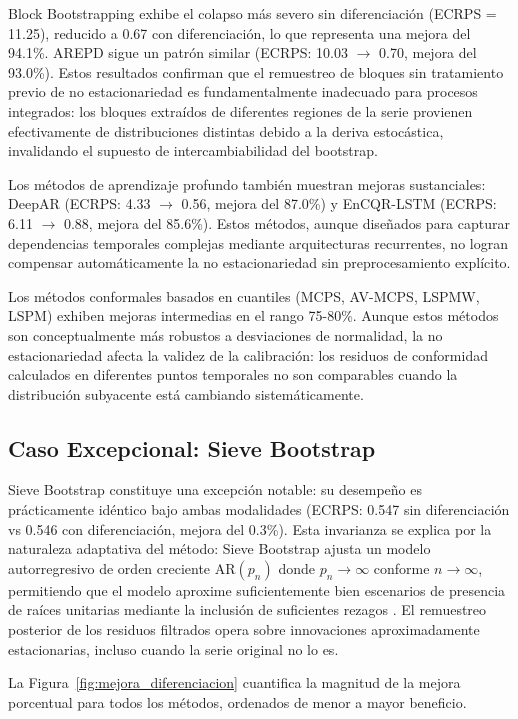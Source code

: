 Block Bootstrapping exhibe el colapso más severo sin diferenciación (ECRPS = 11.25), reducido a 0.67 con diferenciación, lo que representa una mejora del 94.1\%. AREPD sigue un patrón similar (ECRPS: 10.03 $\to$ 0.70, mejora del 93.0\%). Estos resultados confirman que el remuestreo de bloques sin tratamiento previo de no estacionariedad es fundamentalmente inadecuado para procesos integrados: los bloques extraídos de diferentes regiones de la serie provienen efectivamente de distribuciones distintas debido a la deriva estocástica, invalidando el supuesto de intercambiabilidad del bootstrap.

Los métodos de aprendizaje profundo también muestran mejoras sustanciales: DeepAR (ECRPS: 4.33 $\to$ 0.56, mejora del 87.0\%) y EnCQR-LSTM (ECRPS: 6.11 $\to$ 0.88, mejora del 85.6\%). Estos métodos, aunque diseñados para capturar dependencias temporales complejas mediante arquitecturas recurrentes, no logran compensar automáticamente la no estacionariedad sin preprocesamiento explícito.

Los métodos conformales basados en cuantiles (MCPS, AV-MCPS, LSPMW, LSPM) exhiben mejoras intermedias en el rango 75-80\%. Aunque estos métodos son conceptualmente más robustos a desviaciones de normalidad, la no estacionariedad afecta la validez de la calibración: los residuos de conformidad calculados en diferentes puntos temporales no son comparables cuando la distribución subyacente está cambiando sistemáticamente.

\subsection{Caso Excepcional: Sieve Bootstrap}
\label{subsec:sieve_excepcion}

Sieve Bootstrap constituye una excepción notable: su desempeño es prácticamente idéntico bajo ambas modalidades (ECRPS: 0.547 sin diferenciación vs 0.546 con diferenciación, mejora del 0.3\%). Esta invarianza se explica por la naturaleza adaptativa del método: Sieve Bootstrap ajusta un modelo autorregresivo de orden creciente $\text{AR}(p_n)$ donde $p_n \to \infty$ conforme $n \to \infty$, permitiendo que el modelo aproxime suficientemente bien escenarios de presencia de raíces unitarias mediante la inclusión de suficientes rezagos \parencite{Buhlmann1997}. El remuestreo posterior de los residuos filtrados opera sobre innovaciones aproximadamente estacionarias, incluso cuando la serie original no lo es.

La Figura~\ref{fig:mejora_diferenciacion} cuantifica la magnitud de la mejora porcentual para todos los métodos, ordenados de menor a mayor beneficio.

